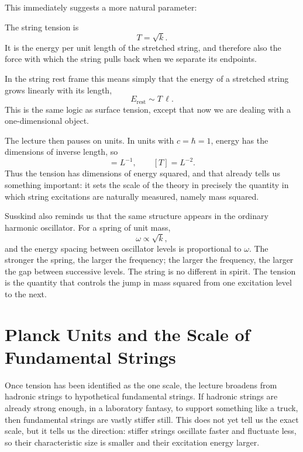 This immediately suggests a more natural parameter:
\begin{definition}
The string tension is
\begin{equation}
T=\sqrt{k}.
\end{equation}
It is the energy per unit length of the stretched string, and therefore also the force with which the string pulls back when we separate its endpoints.
\end{definition}

In the string rest frame this means simply that the energy of a stretched string grows linearly with its length,
\begin{equation}
E_{\text{rest}}\sim T\,\ell.
\end{equation}
This is the same logic as surface tension, except that now we are dealing with a one-dimensional object.

The lecture then pauses on units. In units with \(c=\hbar=1\), energy has the dimensions of inverse length, so
\begin{equation}
[E]=L^{-1},
\qquad
[T]=L^{-2}.
\end{equation}
Thus the tension has dimensions of energy squared, and that already tells us something important: it sets the scale of the theory in precisely the quantity in which string excitations are naturally measured, namely mass squared.

Susskind also reminds us that the same structure appears in the ordinary harmonic oscillator. For a spring of unit mass,
\begin{equation}
\omega\propto \sqrt{k},
\end{equation}
and the energy spacing between oscillator levels is proportional to \(\omega\). The stronger the spring, the larger the frequency; the larger the frequency, the larger the gap between successive levels. The string is no different in spirit. The tension is the quantity that controls the jump in mass squared from one excitation level to the next.

\section{Planck Units and the Scale of Fundamental Strings}

Once tension has been identified as the one scale, the lecture broadens from hadronic strings to hypothetical fundamental strings. If hadronic strings are already strong enough, in a laboratory fantasy, to support something like a truck, then fundamental strings are vastly stiffer still. This does not yet tell us the exact scale, but it tells us the direction: stiffer strings oscillate faster and fluctuate less, so their characteristic size is smaller and their excitation energy larger.

